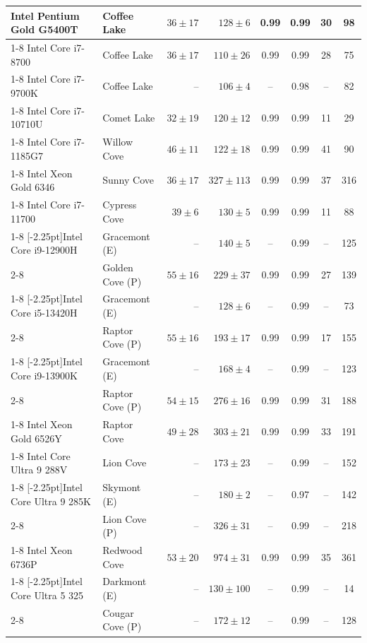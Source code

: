 \begin{tabular}{ll@{\hspace{2em}}rr@{\hspace{3em}}cc@{\hspace{3em}}cc}
Intel Pentium Gold G5400T & Coffee Lake & $36 \pm 17$ & $128 \pm 6$ & 0.99 & 0.99 & 30 & 98 \\\cmidrule(lr){1-8}
Intel Core i7-8700 & Coffee Lake & $36 \pm 17$ & $110 \pm 26$ & 0.99 & 0.99 & 28 & 75 \\\cmidrule(lr){1-8}
Intel Core i7-9700K & Coffee Lake & -- & $106 \pm 4$ & -- & 0.98 & -- & 82 \\\cmidrule(lr){1-8}
Intel Core i7-10710U & Comet Lake & $32 \pm 19$ & $120 \pm 12$ & 0.99 & 0.99 & 11 & 29 \\\cmidrule(lr){1-8}
Intel Core i7-1185G7 & Willow Cove & $46 \pm 11$ & $122 \pm 18$ & 0.99 & 0.99 & 41 & 90 \\\cmidrule(lr){1-8}
Intel Xeon Gold 6346 & Sunny Cove & $36 \pm 17$ & $327 \pm 113$ & 0.99 & 0.99 & 37 & 316 \\\cmidrule(lr){1-8}
Intel Core i7-11700 & Cypress Cove & $39 \pm 6$ & $130 \pm 5$ & 0.99 & 0.99 & 11 & 88 \\\cmidrule(lr){1-8}
\multirow[c]{2}{*}[-2.25pt]{Intel Core i9-12900H} & Gracemont (E) & -- & $140 \pm 5$ & -- & 0.99 & -- & 125 \\\cmidrule(lr){2-8}
 & Golden Cove (P) & $55 \pm 16$ & $229 \pm 37$ & 0.99 & 0.99 & 27 & 139 \\\cmidrule(lr){1-8}
\multirow[c]{2}{*}[-2.25pt]{Intel Core i5-13420H} & Gracemont (E) & -- & $128 \pm 6$ & -- & 0.99 & -- & 73 \\\cmidrule(lr){2-8}
 & Raptor Cove (P) & $55 \pm 16$ & $193 \pm 17$ & 0.99 & 0.99 & 17 & 155 \\\cmidrule(lr){1-8}
\multirow[c]{2}{*}[-2.25pt]{Intel Core i9-13900K} & Gracemont (E) & -- & $168 \pm 4$ & -- & 0.99 & -- & 123 \\\cmidrule(lr){2-8}
 & Raptor Cove (P) & $54 \pm 15$ & $276 \pm 16$ & 0.99 & 0.99 & 31 & 188 \\\cmidrule(lr){1-8}
Intel Xeon Gold 6526Y & Raptor Cove & $49 \pm 28$ & $303 \pm 21$ & 0.99 & 0.99 & 33 & 191 \\\cmidrule(lr){1-8}
Intel Core Ultra 9 288V & Lion Cove & -- & $173 \pm 23$ & -- & 0.99 & -- & 152 \\\cmidrule(lr){1-8}
\multirow[c]{2}{*}[-2.25pt]{Intel Core Ultra 9 285K} & Skymont (E) & -- & $180 \pm 2$ & -- & 0.97 & -- & 142 \\\cmidrule(lr){2-8}
 & Lion Cove (P) & -- & $326 \pm 31$ & -- & 0.99 & -- & 218 \\\cmidrule(lr){1-8}
Intel Xeon 6736P & Redwood Cove & $53 \pm 20$ & $974 \pm 31$ & 0.99 & 0.99 & 35 & 361 \\\cmidrule(lr){1-8}
\multirow[c]{2}{*}[-2.25pt]{Intel Core Ultra 5 325} & Darkmont (E) & -- & $130 \pm 100$ & -- & 0.99 & -- & 14 \\\cmidrule(lr){2-8}
 & Cougar Cove (P) & -- & $172 \pm 12$ & -- & 0.99 & -- & 128 \\
\bottomrule
\end{tabular}
